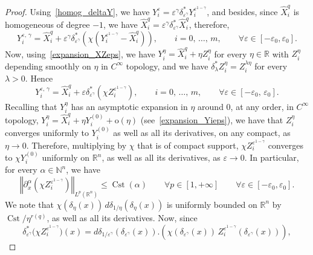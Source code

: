 \documentclass[10pt]{amsart}
\theoremstyle{definition}\newtheorem{defi}[theo]{Definition}\newtheorem{rema}[theo]{Remark}\newtheorem{exam}[theo]{Example}\newtheorem{exem}[theo]{Example}\newtheorem{nota}[theo]{Notation}
\newcommand*\R{\mathbb{R}}
\newcommand*\N{\mathbb{N}}
\newcommand{\rmo}{\mathrm{o}}
\DeclareMathOperator{\Cst}{Cst}
\renewcommand{\leq}{\leqslant}
\let\oldforall\forall
\renewcommand*{\forall}{\mathrel{\oldforall}}
\begin{document}
\begin{proof}
Using~\eqref{homog_deltaY}, we have $Y_i^{\varepsilon} = \varepsilon^\gamma \delta_{\varepsilon^\gamma}^* Y_i^{\varepsilon^{1-\gamma}}$, and besides, since $\widehat{X}_i^{q}$ is homogeneous of degree $-1$, we have $\widehat{X}_i^{q} = \varepsilon^\gamma \delta_{\varepsilon^\gamma}^*\widehat{X}_i^{q}$, therefore,
\begin{equation}\label{Yiepsgammaeps1mgam}
Y_i^{\varepsilon,\,\gamma} = \widehat{X}_i^{q} + \varepsilon^\gamma \delta_{\varepsilon^\gamma}^* \left(\chi \left(Y_i^{\varepsilon^{1-\gamma}} - \widehat{X}_i^{q} \right) \right),\qquad i=0,\,\ldots,\,m,\qquad \forall \varepsilon\in[-\varepsilon_0,\varepsilon_0].
\end{equation}
Now, using~\eqref{expansion_XZeps}, we have $Y_i^{\eta} = \widehat{X}_i^{q} + \eta Z_i^{\eta}$ for every $\eta\in\R$ with $Z_i^{\eta}$ depending smoothly on $\eta$ in $C^\infty$ topology, and we have $\delta_\lambda^* Z_i^{\eta} = Z_i^{\lambda\eta}$ for every $\lambda>0$. Hence
\[
Y_i^{\varepsilon,\,\gamma} = \widehat{X}_i^{q} + \varepsilon \delta_{\varepsilon^\gamma}^* \left(\chi Z_i^{\varepsilon^{1-\gamma}} \right),\qquad i=0,\,\ldots,\,m,\qquad \forall \varepsilon\in[-\varepsilon_0,\,\varepsilon_0].
\]
Recalling that $Y_i^\eta$ has an asymptotic expansion in $\eta$ around $0$, at any order, in $C^\infty$ topology, $Y_i^\eta = \widehat{X}_i^{q}+\eta Y_i^{(0)} + \rmo(\eta)$ (see~\eqref{expansion_Yieps}), we have that $Z_i^\eta$ converges uniformly to $Y_i^{(0)}$ as well as all its derivatives, on any compact, as $\eta\rightarrow 0$. Therefore, multiplying by $\chi$ that is of compact support, $\chi Z_i^{\varepsilon^{1-\gamma}}$ converges to $\chi Y_i^{(0)}$ uniformly on $\R^n$, as well as all its derivatives, as $\varepsilon\rightarrow 0$. In particular, for every $\alpha\in\N^n$, we have
\begin{equation}\label{bound_chiZ}
\left\Vert \partial_x^\alpha \left(\chi Z_i^{\varepsilon^{1-\gamma}} \right) \right\Vert_{L^p(\R^n)} \leq \Cst(\alpha) \qquad \forall p\in[1,+\infty]\qquad \forall \varepsilon\in[-\varepsilon_0,\varepsilon_0].
\end{equation}
We note that $\chi(\delta_\eta(x))\, d\delta_{1/\eta}(\delta_\eta(x))$ is uniformly bounded on $\R^n$ by $\Cst/\eta^{r(q)}$, as well as all its derivatives. Now, since
\[
\delta_{\varepsilon^\gamma}^* \big(\chi Z_i^{\varepsilon^{1-\gamma}} \big) (x) = d\delta_{1/\varepsilon^\gamma}(\delta_{\varepsilon^\gamma}(x)). \left(\chi(\delta_{\varepsilon^\gamma}(x)) \, Z_i^{\varepsilon^{1-\gamma}}(\delta_{\varepsilon^\gamma}(x)) \right),
\]
\end{proof}
\end{document}
